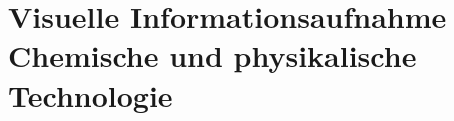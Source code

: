 \section[Optische Informationsaufnahme\hfill Chemische und physikalische Technologie]{Visuelle Informationsaufnahme\\{\normalsize Chemische und physikalische Technologie}}
